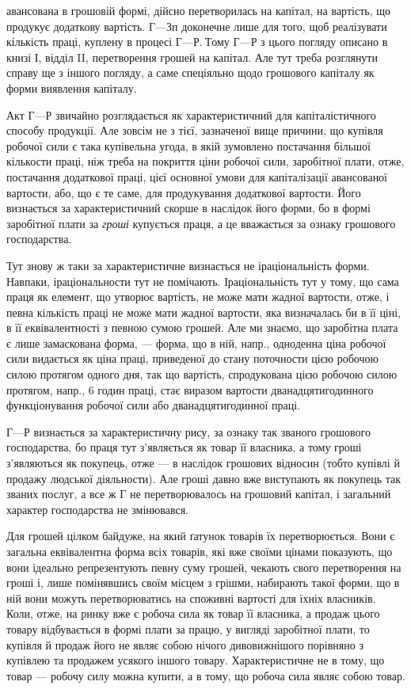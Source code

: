 \parcont{}  %
авансована в грошовій формі, дійсно перетворилась на капітал, на вартість,
що продукує додаткову вартість. $Г — Зп$ доконечне лише для того,
щоб реалізувати кількість праці, куплену в процесі $Г — Р.~Т$ому $Г — Р$
з цього погляду описано в книзі І, відділ II, перетворення грошей
на капітал. Але тут треба розглянути справу ще з іншого погляду,
а саме спеціяльно щодо грошового капіталу як форми виявлення капіталу.

Акт $Г — Р$ звичайно розглядається як характеристичний для капіталістичного
способу продукції. Але зовсім не з тієї, зазначеної вище причини,
що купівля робочої сили є така купівельна угода, в якій зумовлено
постачання більшої кількости праці, ніж треба на покриття ціни робочої
сили, заробітної плати, отже, постачання додаткової праці, цієї основної
умови для капіталізації авансованої вартости, або, що є те саме, для
продукування додаткової вартости. Його визнається за характеристичний
скорше в наслідок його форми, бо в формі заробітної плати за \emph{гроші}
купується праця, а це вважається за ознаку грошового господарства.

Тут знову ж таки за характеристичне визнається не іраціональність
форми. Навпаки, іраціональности тут не помічають. Іраціональність тут у
тому, що сама праця як елемент, що утворює вартість, не може мати
жадної вартости, отже, і певна кількість праці не може мати жадної
вартости, яка визначалась би в її ціні, в її еквівалентності з певною
сумою грошей. Але ми знаємо, що заробітна плата є лише замаскована
форма, — форма, що в ній, напр., одноденна ціна робочої сили видається
як ціна праці, приведеної до стану поточности цією робочою силою протягом
одного дня, так що вартість, спродукована цією робочою силою
протягом, напр., 6 годин праці, стає виразом вартости дванадцятигодинного
функціонування робочої сили або дванадцятигодинної праці.

$Г — Р$ визнається за характеристичну рису, за ознаку так званого грошового
господарства, бо праця тут з’являється як товар її власника, а тому
гроші з’являються як покупець, отже — в наслідок грошових відносин
(тобто купівлі й продажу людської діяльности). Але гроші давно вже
виступають як покупець так званих послуг, а все ж Г не перетворювалось
на грошовий капітал, і загальний характер господарства не
змінювався.

Для грошей цілком байдуже, на який ґатунок товарів їх перетворюється.
Вони є загальна еквівалентна форма всіх товарів, які вже
своїми цінами показують, що вони ідеально репрезентують певну суму грошей,
чекають свого перетворення на гроші і, лише помінявшись своїм місцем
з грішми, набирають такої форми, що в ній вони можуть перетворюватись на
споживні вартості для їхніх власників. Коли, отже, на ринку вже є робоча
сила як товар її власника, а продаж цього товару відбувається в формі
плати за працю, у вигляді заробітної плати, то купівля й продаж його
не являє собою нічого дивовижнішого порівняно з купівлею та
продажем усякого іншого товару. Характеристичне не в тому, що товар
— робочу силу можна купити, а в тому, що робоча сила являє собою
товар.
